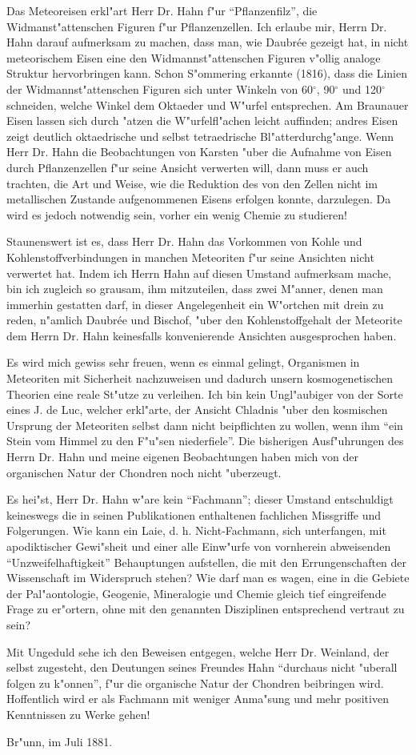 \documentclass[a4paper, 12pt, oneside]{article}
\begin{document}
Das Meteoreisen erkl"art Herr Dr. Hahn f"ur "`Pflanzenfilz"', die Widmanst"attenschen Figuren f"ur Pflanzenzellen. Ich erlaube mir, Herrn Dr. Hahn darauf aufmerksam zu machen, dass man, wie Daubrée gezeigt hat, in nicht meteorischem Eisen eine den Widmannst"attenschen Figuren v"ollig analoge Struktur hervorbringen kann. Schon S"ommering erkannte (1816), dass die Linien der Widmannst"attenschen Figuren sich unter Winkeln von 60$^{\circ}$, 90$^{\circ}$ und 120$^{\circ}$ schneiden, welche Winkel dem Oktaeder und W"urfel entsprechen. Am Braunauer Eisen lassen sich durch "atzen die W"urfelfl"achen leicht auffinden; andres Eisen zeigt deutlich oktaedrische und selbst tetraedrische Bl"atterdurchg"ange. Wenn Herr Dr. Hahn die Beobachtungen von Karsten "uber die Aufnahme von Eisen durch Pflanzenzellen f"ur seine Ansicht verwerten will, dann muss er auch trachten, die Art und Weise, wie die Reduktion des von den Zellen nicht im metallischen Zustande aufgenommenen Eisens erfolgen konnte, darzulegen. Da wird es jedoch notwendig sein, vorher ein wenig Chemie zu studieren!

Staunenswert ist es, dass Herr Dr. Hahn das Vorkommen von Kohle und Kohlenstoffverbindungen in manchen Meteoriten f"ur seine Ansichten nicht verwertet hat. Indem ich Herrn Hahn auf diesen Umstand aufmerksam mache, bin ich zugleich so grausam, ihm mitzuteilen, dass zwei M"anner, denen man immerhin gestatten darf, in dieser Angelegenheit ein W"ortchen mit drein zu reden, n"amlich Daubrée und Bischof, "uber den Kohlenstoffgehalt der Meteorite dem Herrn Dr. Hahn keinesfalls konvenierende Ansichten ausgesprochen haben.

Es wird mich gewiss sehr freuen, wenn es einmal gelingt, Organismen in Meteoriten mit Sicherheit nachzuweisen und dadurch unsern kosmogenetischen Theorien eine reale St"utze zu verleihen. Ich bin kein Ungl"aubiger von der Sorte eines J. de Luc, welcher erkl"arte, der Ansicht Chladnis "uber den kosmischen Ursprung der Meteoriten selbst dann nicht beipflichten zu wollen, wenn ihm "`ein Stein vom Himmel zu den F"u"sen niederfiele"'. Die bisherigen Ausf"uhrungen des Herrn Dr. Hahn und meine eigenen Beobachtungen haben mich von der organischen Natur der Chondren noch nicht "uberzeugt.

Es hei"st, Herr Dr. Hahn w"are kein "`Fachmann"'; dieser Umstand entschuldigt keineswegs die in seinen Publikationen enthaltenen fachlichen Missgriffe und Folgerungen. Wie kann ein Laie, d. h. Nicht-Fachmann, sich unterfangen, mit apodiktischer Gewi"sheit und einer alle Einw"urfe von vornherein abweisenden "`Unzweifelhaftigkeit"' Behauptungen aufstellen, die mit den Errungenschaften der Wissenschaft im Widerspruch stehen? Wie darf man es wagen, eine in die Gebiete der Pal"aontologie, Geogenie, Mineralogie und Chemie gleich tief eingreifende Frage zu er"ortern, ohne mit den genannten Disziplinen entsprechend vertraut zu sein?

Mit Ungeduld sehe ich den Beweisen entgegen, welche Herr Dr. Weinland, der selbst zugesteht, den Deutungen seines Freundes Hahn "`durchaus nicht "uberall folgen zu k"onnen"', f"ur die organische Natur der Chondren beibringen wird. Hoffentlich wird er als Fachmann mit weniger Anma"sung und mehr positiven Kenntnissen zu Werke gehen!

Br"unn, im Juli 1881.
\end{document}
